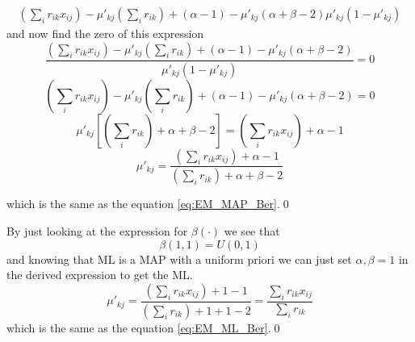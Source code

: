 \documentclass[a4paper,twoside=false,abstract=false,numbers=noenddot,
titlepage=false,headings=small,parskip=half,version=last]{scrartcl}
\begin{document}
\begin{solution}
\begin{eqnarray}
        {
            \left(\sum_i r_{ik}x_{ij}\right) - 
            \mu'_{kj}\left(\sum_i r_{ik}\right) +
            (\alpha-1)-\mu'_{kj}(\alpha+\beta-2)
        }
        {
            \mu'_{kj}(1-\mu'_{kj}) 
        }
    \end{eqnarray}
    and now find the zero of this expression
    \begin{equation}
       \frac
        {
            \left(\sum_i r_{ik}x_{ij}\right) - 
            \mu'_{kj}\left(\sum_i r_{ik}\right) +
            (\alpha-1)-\mu'_{kj}(\alpha+\beta-2)
        }
        {
            \mu'_{kj}(1-\mu'_{kj}) 
        } = 0
    \end{equation}
    \begin{equation}
        \left(\textstyle\sum_i r_{ik}x_{ij}\right) - 
        \mu'_{kj}\left(\textstyle\sum_i r_{ik}\right) +
        (\alpha-1)-\mu'_{kj}(\alpha+\beta-2)
         = 0
    \end{equation}
    \begin{equation}
        \mu'_{kj} \left[\left(\textstyle\sum_i r_{ik}\right)+\alpha+\beta-2\right] 
        = \left(\textstyle\sum_i r_{ik} x_{ij}\right)+\alpha-1
    \end{equation}
    \begin{equation}
        \mu'_{kj} = \frac{
            \left(\sum_i r_{ik} x_{ij}\right)+\alpha-1
        }
        {
            \left(\sum_i r_{ik}\right)+\alpha+\beta-2
        }
    \end{equation}

    which is the same as the equation \eqref{eq:EM_MAP_Ber}.\qed
   
    By just looking at the expression for $\beta(\cdot)$ we see that
    \begin{equation}
        \beta(1,1) = U(0,1) 
    \end{equation}
    and knowing that ML is a MAP with a uniform priori we can just set
    $\alpha,\beta=1$ in the derived expression to get the ML.
    \begin{equation}
        \mu'_{kj} =
        \frac{\left(\sum_ir_{ik}x_{ij}\right)+1-1}{\left(\sum_ir_{ik}\right)+1+1-2} =
        \frac{\sum_ir_{ik}x_{ij}}{\sum_ir_{ik}}
    \end{equation}
    which is the same as the equation \eqref{eq:EM_ML_Ber}.\qed

\end{solution}

\end{document}

